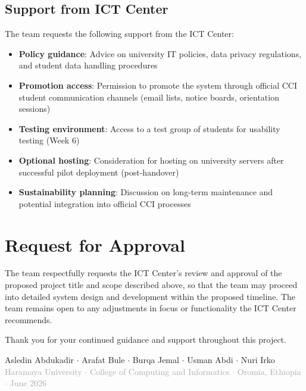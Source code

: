 \documentclass[12pt, a4paper]{article}
\begin{document}
\subsection{Support from ICT Center}

The team requests the following support from the ICT Center:

\begin{itemize}[leftmargin=1.5em, itemsep=3pt]
\item \textbf{Policy guidance}: Advice on university IT policies, data privacy regulations, and student data handling procedures
\item \textbf{Promotion access}: Permission to promote the system through official CCI student communication channels (email lists, notice boards, orientation sessions)
\item \textbf{Testing environment}: Access to a test group of students for usability testing (Week 6)
\item \textbf{Optional hosting}: Consideration for hosting on university servers after successful pilot deployment (post-handover)
\item \textbf{Sustainability planning}: Discussion on long-term maintenance and potential integration into official CCI processes
\end{itemize}

\section{Request for Approval}

The team respectfully requests the ICT Center's review and approval of the proposed project title and scope described above, so that the team may proceed into detailed system design and development within the proposed timeline. The team remains open to any adjustments in focus or functionality the ICT Center recommends. 

Thank you for your continued guidance and support throughout this project.

\vspace{1.5cm}

\begin{tcolorbox}[
    enhanced,
    colback=lightblue,
    colframe=uniblue,
    arc=4pt,
    boxrule=1pt,
    top=8pt, 
    bottom=8pt, 
    left=10pt, 
    right=10pt
]
\centering
{\small\textcolor{uniblue}{%
Asledin Abdukadir $\cdot$ 
Arafat Bule $\cdot$ 
Burqa Jemal $\cdot$ 
Usman Abdi $\cdot$ 
Nuri Irko
}}\\[4pt]
{\small\textcolor{darkgray}{%
Haramaya University $\cdot$ 
College of Computing and Informatics $\cdot$ 
Oromia, Ethiopia $\cdot$ 
June 2026
}}
\end{tcolorbox}

\end{document}
